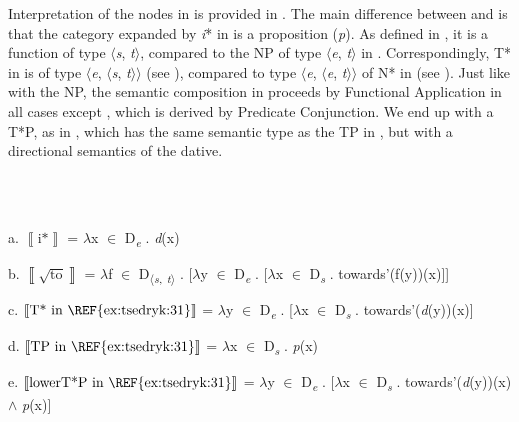 \documentclass[output=paper,colorlinks,citecolor=brown]{./langscibook}
\begin{document}
Interpretation of the nodes in  is provided in . The main difference between  and  is that the category expanded by \textit{i}* in  is a proposition (\textit{p}). As defined in , it is a function of type ${\langle}$\textit{s}, \textit{t}${\rangle}$, compared to the NP of type ${\langle}$\textit{e}, \textit{t}${\rangle}$ in . Correspondingly, T* in  is of type ${\langle}$\textit{e}, ${\langle}$\textit{s}, \textit{t}${\rangle}{\rangle}$ (see ), compared to type ${\langle}$\textit{e}, ${\langle}$\textit{e}, \textit{t}${\rangle}{\rangle}$ of N* in  (see ). Just like with the NP, the semantic composition in  proceeds by Functional Application in all cases except , which is derived by Predicate Conjunction. We end up with a T*P, as in , which has the same semantic type as the TP in , but with a directional semantics of the dative.     

\ea%
    \label{ex:tsedryk:34}
    \gll\\
        \\
    \glt
    \z

          a.   $\left\llbracket \text{i*}\right\rrbracket $ = ${\lambda}$x ${\in}$ D\textit{\textsubscript{e}} . \textit{d}(x)   

  b.   $\left\llbracket \sqrt{\text{to}}\right\rrbracket $ = ${\lambda}$f ${\in}$ D\textsubscript{${\langle}$}\textit{\textsubscript{s}}\textsubscript{,} \textit{\textsubscript{t}}\textsubscript{${\rangle}$} . [${\lambda}$y ${\in}$ D\textit{\textsubscript{e}} . [${\lambda}$x ${\in}$ D\textit{\textsubscript{s}} . towards'(f(y))(x)]]  

  c.   $\left\llbracket \text{T* in \REF{ex:tsedryk:31}}\right\rrbracket $ = ${\lambda}$y ${\in}$ D\textit{\textsubscript{e}} . [${\lambda}$x ${\in}$ D\textit{\textsubscript{s}} . towards'(\textit{d}(y))(x)]    

  d.   $\left\llbracket \text{TP in \REF{ex:tsedryk:31}}\right\rrbracket $ = ${\lambda}$x ${\in}$ D\textit{\textsubscript{s}} . \textit{p}(x)  

  e.   $\left\llbracket \text{lower} \text T\text{*P in \REF{ex:tsedryk:31}}\right\rrbracket $ = ${\lambda}$y ${\in}$ D\textit{\textsubscript{e}} . [${\lambda}$x ${\in}$ D\textit{\textsubscript{s}} . towards'(\textit{d}(y))(x) ${\wedge}$ \textit{p}(x)]
\end{document}
